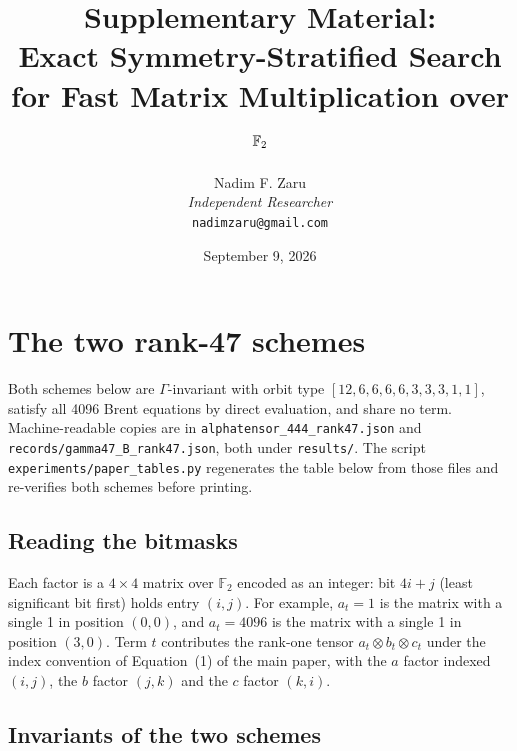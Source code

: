 \documentclass[11pt]{article}
\title{\textbf{Supplementary Material:} \\
Exact Symmetry-Stratified Search for Fast Matrix Multiplication over $\FF$}
\author{
  Nadim F. Zaru \\
  \textit{Independent Researcher} \\
  \texttt{nadimzaru@gmail.com}
}
\date{September 9, 2026}
\newcommand{\FF}{\mathbb{F}_2}
\begin{document}
\maketitle
\tableofcontents
\clearpage

\section{The two rank-47 schemes}

Both schemes below are $\Gamma$-invariant with orbit type $[12,6,6,6,6,3,3,3,1,1]$, satisfy all 4096
Brent equations by direct evaluation, and share no term. Machine-readable copies are in
\texttt{alphatensor\_444\_rank47.json} and \texttt{records/gamma47\_B\_rank47.json}, both under
\texttt{results/}. The script \texttt{experiments/paper\_tables.py} regenerates the table below from
those files and re-verifies both schemes before printing.



\subsection{Reading the bitmasks}

Each factor is a $4\times4$ matrix over $\FF$ encoded as an integer: bit $4i+j$ (least significant bit
first) holds entry $(i,j)$. For example, $a_t = 1$ is the matrix with a single 1 in position $(0,0)$, and
$a_t = 4096$ is the matrix with a single 1 in position $(3,0)$. Term $t$ contributes the rank-one tensor
$a_t \otimes b_t \otimes c_t$ under the index convention of Equation~(1) of the main paper, with the $a$
factor indexed $(i,j)$, the $b$ factor $(j,k)$ and the $c$ factor $(k,i)$.

\subsection{Invariants of the two schemes}
\end{document}
